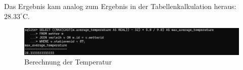 \documentclass{article}
\begin{document}
Das Ergebnis kam analog zum Ergebnis in der Tabellenkalkulation heraus: $28.33^\circ\text{C}$.


\begin{figure}[ht] 
    \centering
    \includegraphics[width = \textwidth]{Screenshot 2024-11-24 202033.png}
    \caption{Berechnung der Temperatur}
    \label{fig:dax}
\end{figure}


\newpage


\end{document}
